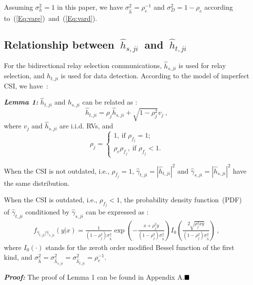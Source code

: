 \documentclass[onecolumn,letterpaper,11pt,draftclsnofoot]{IEEEtran}
\begin{document}
Assuming $\sigma_{h}^2 = 1$ in this paper, we have $\sigma_{\hat
h}^2 = \rho_e^{-1}$ and $\sigma_D^2 = 1 - \rho_e$ according
to~(\ref{Eq:vare})~and~(\ref{Eq:vard}).


\subsection{Relationship between~$\hat h_{s,ji}$~and~$\hat h_{t,ji}$~}
For the bidirectional relay selection communications, $\hat
h_{s,ji}$ is used for relay selection, and $\hat h_{t,ji}$ is used
for data detection. According to the model of imperfect CSI, we
have~:

\textbf{\emph{Lemma 1: }}$\hat h_{t,ji}$ and $\hat h_{s,ji}$ can be
related as :
\begin{equation}\label{Eq:lemma1}
\hat h_{t,ji}  = \rho_j \hat h_{s,ji}  + \sqrt {1 - \rho_j ^2 }
v_j~,
\end{equation}
where $v_j$ and $\hat h_{s,ji}$ are i.i.d. RVs, and
\begin{equation}\label{Eq:rho}
\rho_j =
\begin{cases}
  1, ~\text{if } \rho_{f_j}=1; \\
  \rho_e \rho_{f_j}, ~\text{if } \rho_{f_j}<1.
\end{cases}
\end{equation}

When the CSI is not outdated, i.e., $\rho_{f_j}=1$, $\hat \gamma
_{t,ji}=\left| {\hat h_{t,ji} } \right|^2$ and $\hat \gamma
_{s,ji}=\left| {\hat h_{s,ji} } \right|^2$  have the same
distribution.

When the CSI is outdated, i.e., $\rho_{f_j}<1$, the probability
density function~(PDF) of $\hat \gamma _{t,ji}$ conditioned by $\hat
\gamma _{s,ji}$ can be expressed as :
\begin{align}\label{Eq:ccdf}
f_{\hat \gamma _{t,ji} |\hat \gamma _{s,ji} } \left( {y|x} \right) =
\frac{1}{{\left( {1 - \rho _j^2 } \right)\sigma _{\hat h}^2 }}\exp
\left( { - \frac{{x + \rho _j^2 y}}{{\left( {1 - \rho _j^2 }
\right)\sigma _{\hat h}^2 }}} \right)I_0 \left( {\frac{{2\sqrt {\rho
_j^2 xy} }}{{\left( {1 - \rho _j^2 } \right)\sigma _{\hat h}^2 }}}
\right)~,
\end{align}
where $I_0\left(\cdot \right)$ stands for the zeroth order modified
Bessel function of the first kind\cite{Abramowitz}, and $\sigma
_{\hat h}^2  = \sigma _{\hat h_{s,ji} }^2  = \sigma _{\hat h_{t,ji}
}^2  = \rho _e^{ - 1} $.

\textbf{\emph{Proof:}} The proof of Lemma 1 can be found in Appendix
A.$\hfill \blacksquare$
\end{document}
